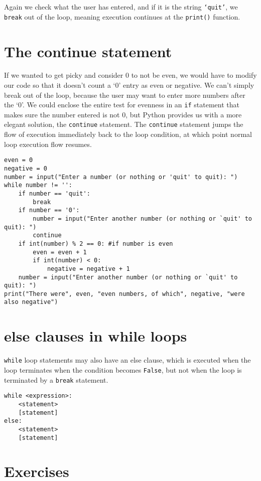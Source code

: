 Again we check what the user has entered, and if it is the string   \texttt{`quit'}, we \texttt{break} out of the loop, meaning execution   continues at the \texttt{print()} function.

\section{The continue statement}

If we wanted to get picky and consider 0 to not be even, we would   have to modify our code so that it doesn't count a `0' entry as even or   negative. We can't simply break out of the loop, because the user may   want to enter more numbers after the `0'. We could enclose the entire   test for evenness in an \texttt{if} statement that makes sure the number entered   is not 0, but Python provides us with a more elegant solution, the \texttt{continue} statement.   The \texttt{continue} statement jumps the flow of execution immediately back to   the loop condition, at which point normal loop execution flow   resumes.
\begin{lstlisting}
even = 0
negative = 0
number = input("Enter a number (or nothing or 'quit' to quit): ")
while number != '':
    if number == 'quit':
        break
    if number == '0':
        number = input("Enter another number (or nothing or `quit' to quit): ")
        continue
    if int(number) % 2 == 0: #if number is even
        even = even + 1
        if int(number) < 0:
            negative = negative + 1
    number = input("Enter another number (or nothing or `quit' to quit): ")
print("There were", even, "even numbers, of which", negative, "were also negative")
\end{lstlisting}

\section{else clauses in while loops}

\texttt{while} loop statements may also have an else clause, which is   executed when the loop terminates when the condition becomes \texttt{False}, but   not when the loop is terminated by a \texttt{break} statement.    
\begin{lstlisting}
while <expression>:
    <statement>
    [statement]
else:
    <statement>
    [statement]
\end{lstlisting}

\section{Exercises}

